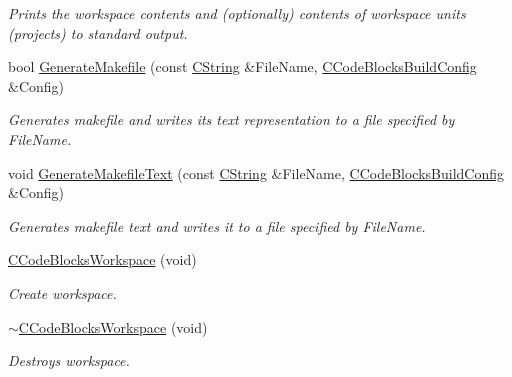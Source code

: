 \begin{DoxyCompactItemize}
\begin{DoxyCompactList}\small\item\em Prints the workspace contents and (optionally) contents of workspace units (projects) to standard output. \end{DoxyCompactList}\item 
bool \hyperlink{classCCodeBlocksWorkspace_a2057d5876c3e450b04295066dcaef035}{Generate\-Makefile} (const \hyperlink{classCString}{C\-String} \&File\-Name, \hyperlink{classCCodeBlocksBuildConfig}{C\-Code\-Blocks\-Build\-Config} \&Config)
\begin{DoxyCompactList}\small\item\em Generates makefile and writes its text representation to a file specified by {\itshape File\-Name}. \end{DoxyCompactList}\item 
void \hyperlink{classCCodeBlocksWorkspace_aef881aafe1c5e43a56ffdcff6b8d8b8d}{Generate\-Makefile\-Text} (const \hyperlink{classCString}{C\-String} \&File\-Name, \hyperlink{classCCodeBlocksBuildConfig}{C\-Code\-Blocks\-Build\-Config} \&Config)
\begin{DoxyCompactList}\small\item\em Generates makefile text and writes it to a file specified by {\itshape File\-Name}. \end{DoxyCompactList}\item 
\hyperlink{classCCodeBlocksWorkspace_ace587b370700c298536c5d65d1f29b88}{C\-Code\-Blocks\-Workspace} (void)
\begin{DoxyCompactList}\small\item\em Create workspace. \end{DoxyCompactList}\item 
\hyperlink{classCCodeBlocksWorkspace_aaeb3537cae380cec19879e73fe8887a2}{$\sim$\-C\-Code\-Blocks\-Workspace} (void)
\begin{DoxyCompactList}\small\item\em Destroys workspace. \end{DoxyCompactList}\end{DoxyCompactItemize}
